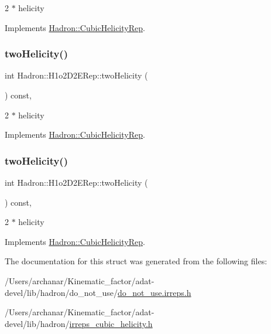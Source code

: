 2 $\ast$ helicity 

Implements \mbox{\hyperlink{structHadron_1_1CubicHelicityRep_af507aa56fc2747eacc8cb6c96db31ecc}{Hadron\+::\+Cubic\+Helicity\+Rep}}.

\mbox{\label{structHadron_1_1H1o2D2ERep_a77a9c97dc4d7a120053dfb21794122ef}} 
\subsubsection{\texorpdfstring{twoHelicity()}{twoHelicity()}\hspace{0.1cm}{\footnotesize\ttfamily [2/3]}}
{\footnotesize\ttfamily int Hadron\+::\+H1o2\+D2\+E\+Rep\+::two\+Helicity (\begin{DoxyParamCaption}{ }\end{DoxyParamCaption}) const\hspace{0.3cm}{\ttfamily [inline]}, {\ttfamily [virtual]}}

2 $\ast$ helicity 

Implements \mbox{\hyperlink{structHadron_1_1CubicHelicityRep_af507aa56fc2747eacc8cb6c96db31ecc}{Hadron\+::\+Cubic\+Helicity\+Rep}}.

\mbox{\label{structHadron_1_1H1o2D2ERep_a77a9c97dc4d7a120053dfb21794122ef}} 
\subsubsection{\texorpdfstring{twoHelicity()}{twoHelicity()}\hspace{0.1cm}{\footnotesize\ttfamily [3/3]}}
{\footnotesize\ttfamily int Hadron\+::\+H1o2\+D2\+E\+Rep\+::two\+Helicity (\begin{DoxyParamCaption}{ }\end{DoxyParamCaption}) const\hspace{0.3cm}{\ttfamily [inline]}, {\ttfamily [virtual]}}

2 $\ast$ helicity 

Implements \mbox{\hyperlink{structHadron_1_1CubicHelicityRep_af507aa56fc2747eacc8cb6c96db31ecc}{Hadron\+::\+Cubic\+Helicity\+Rep}}.



The documentation for this struct was generated from the following files\+:\begin{DoxyCompactItemize}
\item 
/\+Users/archanar/\+Kinematic\+\_\+factor/adat-\/devel/lib/hadron/do\+\_\+not\+\_\+use/\mbox{\hyperlink{adat-devel_2lib_2hadron_2do__not__use_2do__not__use_8irreps_8h}{do\+\_\+not\+\_\+use.\+irreps.\+h}}\item 
/\+Users/archanar/\+Kinematic\+\_\+factor/adat-\/devel/lib/hadron/\mbox{\hyperlink{adat-devel_2lib_2hadron_2irreps__cubic__helicity_8h}{irreps\+\_\+cubic\+\_\+helicity.\+h}}\end{DoxyCompactItemize}
